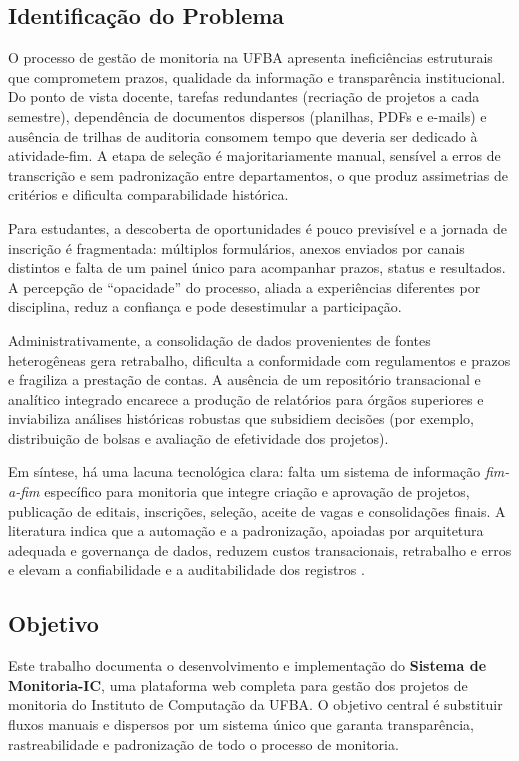 \documentclass[portuguese]{sbc2025}%
\begin{document}
\subsection{Identificação do Problema}

O processo de gestão de monitoria na UFBA apresenta ineficiências estruturais que comprometem prazos, qualidade da informação e transparência institucional. Do ponto de vista docente, tarefas redundantes (recriação de projetos a cada semestre), dependência de documentos dispersos (planilhas, PDFs e e-mails) e ausência de trilhas de auditoria consomem tempo que deveria ser dedicado à atividade-fim. A etapa de seleção é majoritariamente manual, sensível a erros de transcrição e sem padronização entre departamentos, o que produz assimetrias de critérios e dificulta comparabilidade histórica.

Para estudantes, a descoberta de oportunidades é pouco previsível e a jornada de inscrição é fragmentada: múltiplos formulários, anexos enviados por canais distintos e falta de um painel único para acompanhar prazos, status e resultados. A percepção de “opacidade” do processo, aliada a experiências diferentes por disciplina, reduz a confiança e pode desestimular a participação.

Administrativamente, a consolidação de dados provenientes de fontes heterogêneas gera retrabalho, dificulta a conformidade com regulamentos e prazos e fragiliza a prestação de contas. A ausência de um repositório transacional e analítico integrado encarece a produção de relatórios para órgãos superiores e inviabiliza análises históricas robustas que subsidiem decisões (por exemplo, distribuição de bolsas e avaliação de efetividade dos projetos).

Em síntese, há uma lacuna tecnológica clara: falta um sistema de informação \textit{fim-a-fim} específico para monitoria que integre criação e aprovação de projetos, publicação de editais, inscrições, seleção, aceite de vagas e consolidações finais. A literatura indica que a automação e a padronização, apoiadas por arquitetura adequada e governança de dados, reduzem custos transacionais, retrabalho e erros e elevam a confiabilidade e a auditabilidade dos registros \cite{Davenport1993, Hammer1993, Laudon_Laudon_2011, OECD2020, UNESCO2022}.

\subsection{Objetivo}

Este trabalho documenta o desenvolvimento e implementação do \textbf{Sistema de Monitoria-IC}, uma plataforma web completa para gestão dos projetos de monitoria do Instituto de Computação da UFBA. O objetivo central é substituir fluxos manuais e dispersos por um sistema único que garanta transparência, rastreabilidade e padronização de todo o processo de monitoria.
\end{document}
